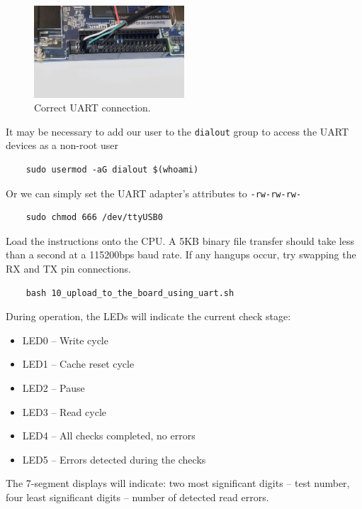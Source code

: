 \documentclass[a4paper]{article}
\let\oldtexttt\texttt
\renewcommand{\texttt}[1]{\textcolor{mygray}{\oldtexttt{#1}}}
\begin{document}
\begin{figure}[H]
    \centering
    \includegraphics[width=0.5\textwidth]{uart-connection.jpg}
    \captionsetup{width=0.8\textwidth}
    \caption{Correct UART connection.}
\end{figure}

It may be necessary to add our user to the \texttt{dialout} group to access the UART devices as a non-root user

\begin{lstlisting}
    sudo usermod -aG dialout $(whoami)
\end{lstlisting}

Or we can simply set the UART adapter's attributes to \texttt{-rw-rw-rw-}

\begin{lstlisting}
    sudo chmod 666 /dev/ttyUSB0
\end{lstlisting}

Load the instructions onto the CPU. A 5KB binary file transfer should take less
than a second at a 115200bps baud rate. If any hangups occur, try swapping the
RX and TX pin connections.

\begin{lstlisting}
    bash 10_upload_to_the_board_using_uart.sh
\end{lstlisting}

During operation, the LEDs will indicate the current check stage:

\begin{itemize}
    \itemsep0em
    \item LED0 -- Write cycle
    \item LED1 -- Cache reset cycle
    \item LED2 -- Pause
    \item LED3 -- Read cycle
    \item LED4 -- All checks completed, no errors
    \item LED5 -- Errors detected during the checks
\end{itemize}

The 7-segment displays will indicate: two most significant digits -- test
number, four least significant digits -- number of detected read errors.
\end{document}
